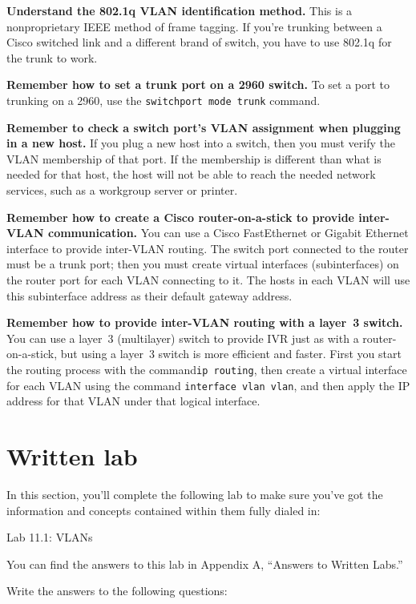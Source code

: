 \textbf{Understand the 802.1q VLAN identification method.} This is a
nonproprietary IEEE method of frame tagging. If you're trunking between
a Cisco switched link and a different brand of switch, you have to use
802.1q for the trunk to work.

\textbf{Remember how to set a trunk port on a 2960 switch.} To set a
port to trunking on a 2960, use the \texttt{switchport\ mode\ trunk}
command.

\textbf{Remember to check a switch port's VLAN assignment when plugging
in a new host.} If you plug a new host into a switch, then you must
verify the VLAN membership of that port. If the membership is different
than what is needed for that host, the host will not be able to reach
the needed network services, such as a workgroup server or printer.

\textbf{Remember how to create a Cisco router-on-a-stick to provide
inter-VLAN communication.} You can use a Cisco FastEthernet or Gigabit
Ethernet interface to provide inter-VLAN routing. The switch port
connected to the router must be a trunk port; then you must create
virtual interfaces
(subinterfaces) on the router port for each VLAN connecting to it. The
hosts in each VLAN will use this subinterface address as their default
gateway address.

\textbf{Remember how to provide inter-VLAN routing with a layer~3
switch.} You can use a layer~3 (multilayer) switch to provide IVR just
as with a router-on-a-stick, but using a layer~3 switch is more
efficient and faster. First you start the routing process with the
command\texttt{ip\ routing}, then create a virtual interface for each
VLAN using the command \texttt{interface\ vlan\ vlan}, and then apply
the IP address for that VLAN under that logical interface.

\section{Written lab}

In this section, you'll complete the following lab to make sure you've
got the information and concepts contained within them fully dialed in:

Lab 11.1: VLANs

You can find the answers to this lab in Appendix A, ``Answers to Written
Labs.''

Write the answers to the following questions:


